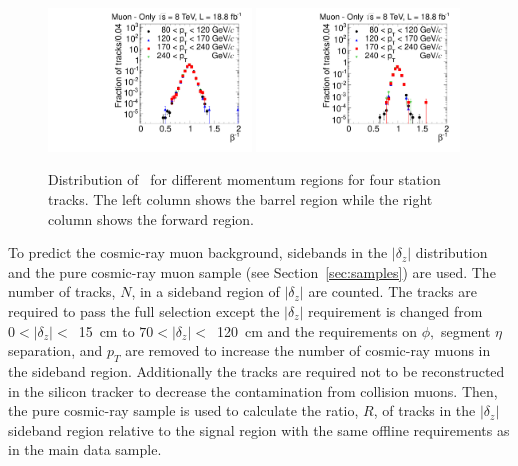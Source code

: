 \begin{figure}
\begin{center}
\includegraphics[clip=false, trim=0.0cm 0cm 0.0cm 0cm, width=0.48\textwidth]{figures/muonly/Control_Data8TeV_Pt_TOFSpectrum_Binned_2}
\includegraphics[clip=false, trim=0.0cm 0cm 0.0cm 0cm, width=0.48\textwidth]{figures/muonly/Control_Data8TeV_Pt_TOFSpectrum_Binned_5}
\caption[Distribution of \invbeta\
  for different momentum regions for four station tracks in the \muononly\ analysis.]
{Distribution of \invbeta\
for different momentum regions for four station tracks.
The  left column shows the barrel region while the right column
shows the forward region.}
\label{fig:MuOnlyControl4}
\end{center}
\end{figure}

To predict the cosmic-ray muon background, sidebands in the $|\delta_z|$ distribution and the pure cosmic-ray muon sample (see Section~\ref{sec:samples}) are used.
The number of tracks, $N$, in a sideband region of $|\delta_z|$ are counted. The tracks are required to pass the full selection except the $|\delta_z|$ requirement 
is changed from $0 < |\delta_z| <$~15~cm to $70 < |\delta_z| <$~120~cm and
the requirements on $\phi,$ segment $\eta$ separation, and $p_T$ are removed to increase the number of cosmic-ray muons in the sideband region. 
Additionally the tracks
are required not to be reconstructed in the silicon tracker to decrease the contamination from collision muons. 
Then, the pure cosmic-ray sample is used to calculate the ratio, $R$, of tracks in the $|\delta_z|$ sideband region 
relative to the signal region with the same offline requirements as in the main data sample. 

